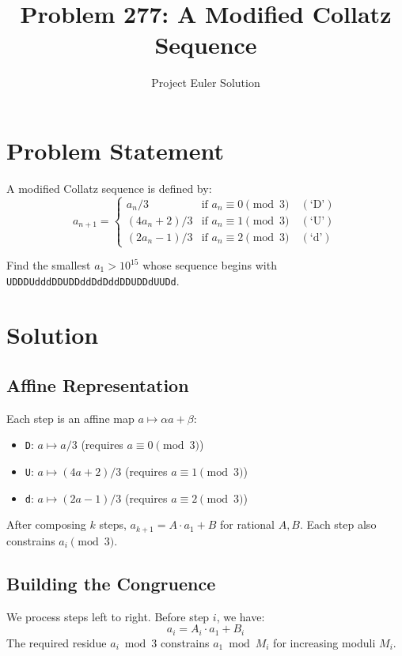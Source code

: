 \documentclass[12pt]{article}
\title{Problem 277: A Modified Collatz Sequence}
\author{Project Euler Solution}
\date{}
\begin{document}
\maketitle

\section{Problem Statement}
A modified Collatz sequence is defined by:
\[
a_{n+1} = \begin{cases}
a_n / 3 & \text{if } a_n \equiv 0 \pmod{3} \quad (\text{`D'})\\
(4a_n + 2) / 3 & \text{if } a_n \equiv 1 \pmod{3} \quad (\text{`U'})\\
(2a_n - 1) / 3 & \text{if } a_n \equiv 2 \pmod{3} \quad (\text{`d'})
\end{cases}
\]

Find the smallest $a_1 > 10^{15}$ whose sequence begins with \texttt{UDDDUdddDDUDDddDdDddDDUDDdUUDd}.

\section{Solution}

\subsection{Affine Representation}

Each step is an affine map $a \mapsto \alpha a + \beta$:
\begin{itemize}
    \item \texttt{D}: $a \mapsto a/3$ (requires $a \equiv 0 \pmod{3}$)
    \item \texttt{U}: $a \mapsto (4a+2)/3$ (requires $a \equiv 1 \pmod{3}$)
    \item \texttt{d}: $a \mapsto (2a-1)/3$ (requires $a \equiv 2 \pmod{3}$)
\end{itemize}

After composing $k$ steps, $a_{k+1} = A \cdot a_1 + B$ for rational $A, B$. Each step also constrains $a_i \pmod{3}$.

\subsection{Building the Congruence}

We process steps left to right. Before step $i$, we have:
\[
a_i = A_i \cdot a_1 + B_i
\]
The required residue $a_i \bmod 3$ constrains $a_1 \bmod M_i$ for increasing moduli $M_i$.
\end{document}
